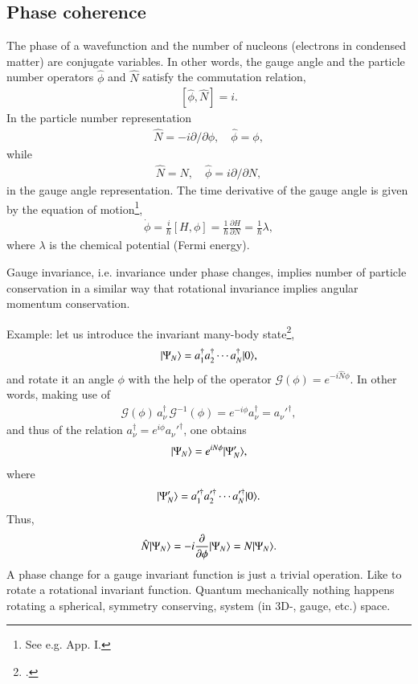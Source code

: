 \subsection{Phase coherence}\label{C3AppD}
The phase of a wavefunction and the number of nucleons (electrons in condensed matter) are conjugate variables. In other words, the gauge angle and the particle number operators $\hat{\phi}$ and $\hat N$ satisfy the commutation relation,
  \begin{align}\label{eq3.7.8}
\left[\hat{\phi},\hat{N}\right]=i.
    \end{align}
In the particle number representation
  \begin{align}\label{eq3.7.9}
\hat N=-i\partial/\partial \phi,\quad \hat \phi=\phi,
    \end{align}
while
  \begin{align}\label{eq3.7.10}
\hat N=N,\quad \hat\phi=i\partial/\partial N,
    \end{align}
in the gauge angle representation. The time derivative of the gauge angle is given by the equation of motion\footnote{See e.g. \cite{Brink:05} App. I.},
  \begin{align}\label{eq3.7.11}
  \dot{\phi}=\frac{i}{\hbar}\left[H,\phi \right]=\frac{1}{\hbar}\frac{\partial H}{\partial N}=\frac{1}{\hbar}\lambda,
    \end{align}
where $\lambda$ is the chemical potential (Fermi energy).







 Gauge invariance, i.e. invariance under phase changes, implies number of particle conservation in a similar way that rotational invariance implies angular momentum conservation.

Example: let us introduce the  invariant many-body state\footnote{\cite{Anderson:64b}.},
\begin{align}\label{eq3.7.12}
|{\Psi_N} \rangle=a_1^\dagger a_2^\dagger\dotsb a_N^\dagger |{0} \rangle,
\end{align}
and rotate it an angle $\phi$ with the help of the operator $\mathcal G(\phi)=e^{-i\hat N\phi}$. In other words, making use of
\begin{align}\label{eq3.7.15}
\mathcal G(\phi)\,a_\nu^\dagger\, \mathcal G^{-1}(\phi)=e^{-i\phi}a_\nu^\dagger=a_\nu'^\dagger,
\end{align}
and thus of the relation $a_\nu^\dagger=e^{i\phi}a_\nu'^\dagger$, one obtains
\begin{align}\label{eq3.7.13}
|{\Psi_N} \rangle=e^{iN\phi}|{\Psi'_N} \rangle,
\end{align}
where
\begin{align}\label{eq3.7.14}
|{\Psi'_N} \rangle=a_1'^\dagger a_2'^\dagger\dotsb a_N'^\dagger|{0} \rangle.
\end{align}
Thus,
\begin{align}\label{eq3.7.17}
\hat N|{\Psi_N} \rangle=-i\frac{\partial}{\partial \phi}|{\Psi_N} \rangle=N|{\Psi_N} \rangle.
\end{align}
 A phase change for a gauge invariant function is just a trivial operation. Like to rotate a rotational invariant function. Quantum mechanically nothing happens rotating a spherical, symmetry conserving, system (in 3D-, gauge, etc.) space.



